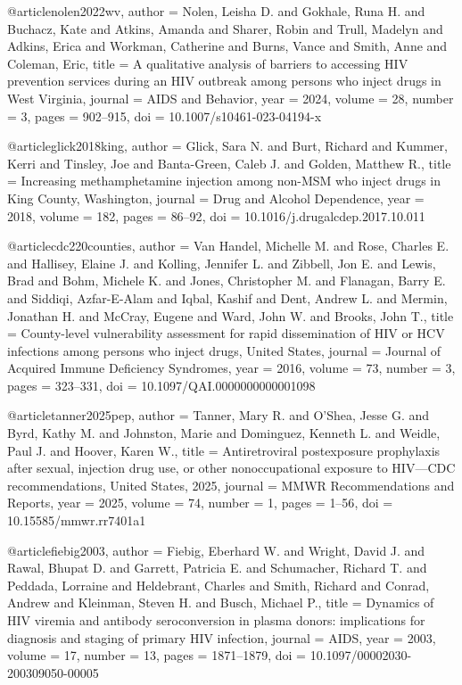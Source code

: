 @article{nolen2022wv,
  author  = {Nolen, Leisha D. and Gokhale, Runa H. and Buchacz, Kate and Atkins, Amanda and Sharer, Robin and Trull, Madelyn and Adkins, Erica and Workman, Catherine and Burns, Vance and Smith, Anne and Coleman, Eric},
  title   = {A qualitative analysis of barriers to accessing {HIV} prevention services during an {HIV} outbreak among persons who inject drugs in {West Virginia}},
  journal = {AIDS and Behavior},
  year    = {2024},
  volume  = {28},
  number  = {3},
  pages   = {902--915},
  doi     = {10.1007/s10461-023-04194-x}
}

@article{glick2018king,
  author  = {Glick, Sara N. and Burt, Richard and Kummer, Kerri and Tinsley, Joe and Banta-Green, Caleb J. and Golden, Matthew R.},
  title   = {Increasing methamphetamine injection among non-{MSM} who inject drugs in {King County, Washington}},
  journal = {Drug and Alcohol Dependence},
  year    = {2018},
  volume  = {182},
  pages   = {86--92},
  doi     = {10.1016/j.drugalcdep.2017.10.011}
}

@article{cdc220counties,
  author  = {Van Handel, Michelle M. and Rose, Charles E. and Hallisey, Elaine J. and Kolling, Jennifer L. and Zibbell, Jon E. and Lewis, Brad and Bohm, Michele K. and Jones, Christopher M. and Flanagan, Barry E. and Siddiqi, Azfar-E-Alam and Iqbal, Kashif and Dent, Andrew L. and Mermin, Jonathan H. and McCray, Eugene and Ward, John W. and Brooks, John T.},
  title   = {County-level vulnerability assessment for rapid dissemination of {HIV} or {HCV} infections among persons who inject drugs, {United States}},
  journal = {Journal of Acquired Immune Deficiency Syndromes},
  year    = {2016},
  volume  = {73},
  number  = {3},
  pages   = {323--331},
  doi     = {10.1097/QAI.0000000000001098}
}

@article{tanner2025pep,
  author  = {Tanner, Mary R. and O'Shea, Jesse G. and Byrd, Kathy M. and Johnston, Marie and Dominguez, Kenneth L. and Weidle, Paul J. and Hoover, Karen W.},
  title   = {Antiretroviral postexposure prophylaxis after sexual, injection drug use, or other nonoccupational exposure to {HIV}---{CDC} recommendations, {United States}, 2025},
  journal = {MMWR Recommendations and Reports},
  year    = {2025},
  volume  = {74},
  number  = {1},
  pages   = {1--56},
  doi     = {10.15585/mmwr.rr7401a1}
}

@article{fiebig2003,
  author  = {Fiebig, Eberhard W. and Wright, David J. and Rawal, Bhupat D. and Garrett, Patricia E. and Schumacher, Richard T. and Peddada, Lorraine and Heldebrant, Charles and Smith, Richard and Conrad, Andrew and Kleinman, Steven H. and Busch, Michael P.},
  title   = {Dynamics of {HIV} viremia and antibody seroconversion in plasma donors: implications for diagnosis and staging of primary {HIV} infection},
  journal = {AIDS},
  year    = {2003},
  volume  = {17},
  number  = {13},
  pages   = {1871--1879},
  doi     = {10.1097/00002030-200309050-00005}
}

